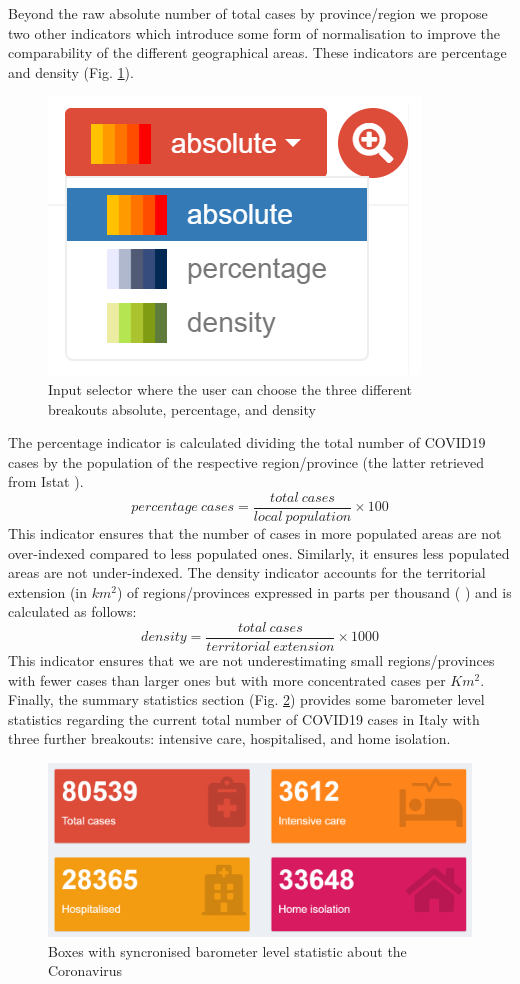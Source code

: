 \documentclass[
12pt, %
a4paper, %
oneside, %
headinclude,footinclude, %
BCOR5mm, %
]{scrartcl}
\begin{document}
Beyond the raw absolute number of total cases by province/region we propose two other indicators which introduce some form of normalisation to improve the comparability of the different geographical areas. These indicators are percentage and density (Fig. \ref{Home_fig2}).

\begin{figure}[h]
 \centering
 \includegraphics[width=0.5\linewidth]{Figures/Home_figure_2.png} 
 \caption{Input selector where the user can choose the three different breakouts absolute, percentage, and density}
 \label{Home_fig2}
\end{figure}

The percentage indicator is calculated dividing the total number of COVID19 cases by the population of the respective region/province (the latter retrieved from Istat \cite{Istat+res0,Istat+res1}).
\begin{equation}
percentage~cases = \frac{total~cases}{local~population} \times 100
\end{equation}
This indicator ensures that the number of cases in more populated areas are not over-indexed compared to less populated ones. Similarly, it ensures less populated areas are not under-indexed. The density  indicator accounts for the territorial extension (in $km^2$) of regions/provinces expressed in parts per thousand (  \textperthousand ) and is calculated as follows:
\begin{equation}
density =  \dfrac{total~cases}{territorial~extension}\times 1000
\end{equation}
This indicator ensures that we are not underestimating small regions/provinces with fewer cases than larger ones but with more concentrated cases per $Km^2$. Finally, the summary statistics section (Fig. \ref{Home_fig3}) provides some barometer level statistics regarding the current total number of COVID19 cases in Italy with three further breakouts: intensive care, hospitalised, and home isolation.

\begin{figure}[h]
 \centering
 \includegraphics[width=0.5\linewidth]{Figures/Home_figure_3.png} 
 \caption{Boxes with syncronised barometer level statistic about the Coronavirus}
 \label{Home_fig3}
\end{figure}
\end{document}
